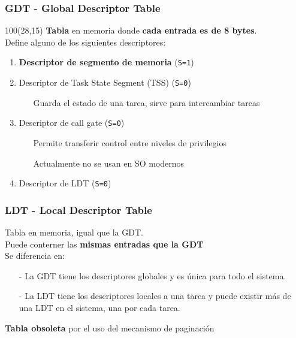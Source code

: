 \documentclass[aspectratio=169]{beamer}
\begin{document}
\begin{frame}
    \frametitle{GDT - Global Descriptor Table}
    \begin{textblock}{100}(28,15)
    \textbf{Tabla} en memoria donde \textbf{cada entrada es de 8 bytes}.\\
    Define alguno de los siguientes descriptores:
    \vspace{0.5cm}
    \begin{enumerate}
    \setlength\itemsep{0.8em}
    \item<2->[-] \normalsize \textbf{Descriptor de segmento de memoria} \small \textcolor{verdeuca}{(\texttt{S=1})}
    \item<3->[-] \normalsize Descriptor de Task State Segment (TSS) \small \textcolor{verdeuca}{(\texttt{S=0})}
    \begin{enumerate}
    \setlength\itemsep{0em}
    \item[] \scriptsize Guarda el estado de una tarea, sirve para intercambiar tareas
    \end{enumerate} \normalsize
    \item<4->[-] \normalsize Descriptor de call gate \small \textcolor{verdeuca}{(\texttt{S=0})}
    \begin{enumerate}
    \setlength\itemsep{0em}
    \item[] \scriptsize Permite transferir control entre niveles de privilegios
    \item[] \scriptsize Actualmente no se usan en SO modernos
    \end{enumerate} \normalsize
    \item<5->[-] \normalsize Descriptor de LDT \small \textcolor{verdeuca}{(\texttt{S=0})}
    \end{enumerate}
    \vspace{0.5cm}
    \end{textblock}
\end{frame}

\begin{frame}
    \frametitle{LDT - Local Descriptor Table}
    Tabla en memoria, igual que la GDT.\\
    Puede conterner las \textbf{mismas entradas que la GDT}\\
    \vspace{0.5cm}
    \pause
    Se diferencia en:
    \vspace{0.3cm}
    \begin{itemize}
    \item[-] La GDT tiene los descriptores globales y es única para todo el sistema.
    \pause
    \item[-] La LDT tiene los descriptores locales a una tarea y puede existir más de una LDT en el sistema, una por cada tarea.
    \end{itemize}
    \vspace{0.8cm}
    \pause
    \textcolor{naranjauca}{\textbf{Tabla obsoleta} por el uso del mecanismo de paginación}
\end{frame}
\end{document}
